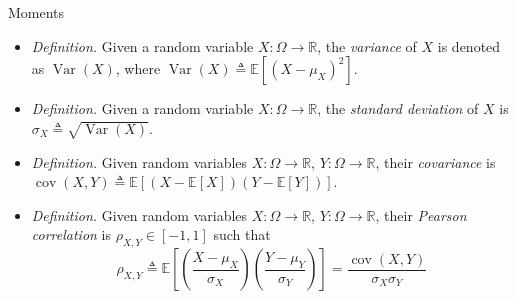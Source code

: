 \documentclass{beamer}
\numberwithin{equation}{section}
\begin{document}
\begin{frame}{Moments}
    \begin{itemize}
        \item
        \textit{Definition.} Given a random variable $ X : \Omega \rightarrow
        \mathbb{R} $, the \textit{variance} of $ X $ is denoted as
        $ \operatorname{Var}(X) $, where $ \operatorname{Var}(X) \triangleq
        \mathbb{E}\left[(X - \mu_X)^2\right] $.

        \item
        \textit{Definition.} Given a random variable $ X : \Omega \rightarrow
        \mathbb{R} $, the \textit{standard deviation} of $ X $ is
        $ \sigma_X \triangleq \sqrt{\operatorname{Var}(X)} $.

        \item
        \textit{Definition.} Given random variables
        $ X : \Omega \rightarrow \mathbb{R} $,
        $ Y : \Omega \rightarrow \mathbb{R} $, their \textit{covariance} is
        $ \operatorname{cov}(X, Y) \triangleq
        \mathbb{E}[(X - \mathbb{E}[X])(Y - \mathbb{E}[Y])] $.

        \item
        \textit{Definition.} Given random variables $ X : \Omega \rightarrow
        \mathbb{R} $, $ Y : \Omega \rightarrow \mathbb{R} $, their
        \textit{Pearson correlation} is $ \rho_{X, Y} \in [-1, 1] $ such that
        \begin{equation*}
            \rho_{X, Y} \triangleq \mathbb{E}\left[
                \left(\frac{X - \mu_X}{\sigma_X}\right)
                \left(\frac{Y - \mu_Y}{\sigma_Y}\right)
            \right] = \frac{\operatorname{cov}(X, Y)}{\sigma_X\sigma_Y}
        \end{equation*}
    \end{itemize}
\end{frame}
\end{document}
